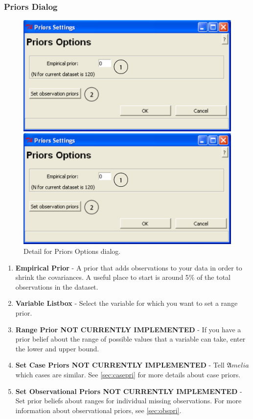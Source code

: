 \documentclass[12pt,titlepage]{article}
\begin{document}
\subsubsection{Priors Dialog}
\label{sec:pridiag}
\begin{figure}[ht]
 \begin{htmlonly} 
  \centering \includegraphics[scale=1]{priors} 
 \end{htmlonly}
 \begin{latexonly}
  \centering \includegraphics[scale=.75]{priors}
 \end{latexonly}
  \caption{Detail for Priors Options dialog.}
\end{figure}
\begin{enumerate}
\item \textbf{Empirical Prior} - A prior that adds observations to
  your data in order to shrink the covariances.  A useful place to
  start is around 5\% of the total observations in the dataset.
\item \textbf{Variable Listbox} - Select the variable for which you
  want to set a range prior.
\item \textbf{Range Prior \textbf{NOT CURRENTLY IMPLEMENTED}} - If you
  have a prior belief about the range of possible values that a
  variable can take, enter the lower and upper bound.
\item \textbf{Set Case Priors \textbf{NOT CURRENTLY IMPLEMENTED}} -
  Tell ${\mathfrak Amelia}$ which cases are similar.  See
  \ref{sec:casepri} for more details about case priors.
\item \textbf{Set Observational Priors \textbf{NOT CURRENTLY
      IMPLEMENTED}} - Set prior beliefs about ranges for individual
  missing observations.  For more information about observational
  priors, see \ref{sec:obspri}.
\end{enumerate}
\end{document}
